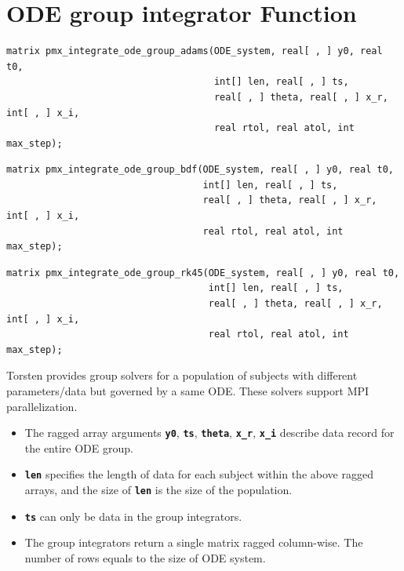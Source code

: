 \documentclass[11pt, reqno, oneside]{amsbook}
\numberwithin{equation}{chapter}
\numberwithin{figure}{chapter}
\numberwithin{table}{chapter}
\theoremstyle{remark}
\begin{document}
\section{ODE group  integrator Function}
\label{sec:org5e1b7bb}
\begin{verbatim}
matrix pmx_integrate_ode_group_adams(ODE_system, real[ , ] y0, real t0,
                                     int[] len, real[ , ] ts,
                                     real[ , ] theta, real[ , ] x_r, int[ , ] x_i,
                                     real rtol, real atol, int max_step);
\end{verbatim}
\begin{verbatim}
matrix pmx_integrate_ode_group_bdf(ODE_system, real[ , ] y0, real t0,
                                   int[] len, real[ , ] ts,
                                   real[ , ] theta, real[ , ] x_r, int[ , ] x_i,
                                   real rtol, real atol, int max_step);
\end{verbatim}
\begin{verbatim}
matrix pmx_integrate_ode_group_rk45(ODE_system, real[ , ] y0, real t0,
                                    int[] len, real[ , ] ts,
                                    real[ , ] theta, real[ , ] x_r, int[ , ] x_i,
                                    real rtol, real atol, int max_step);
\end{verbatim}
Torsten provides group solvers for a population of subjects with different parameters/data but
governed by a same ODE. These solvers support MPI parallelization.
\begin{itemize}
\item The ragged array arguments {\small \color{MRGGreen} \texttt{\textbf{y0}}}, {\small \color{MRGGreen} \texttt{\textbf{ts}}}, {\small \color{MRGGreen} \texttt{\textbf{theta}}}, {\small \color{MRGGreen} \texttt{\textbf{x\_r}}}, {\small \color{MRGGreen} \texttt{\textbf{x\_i}}} describe data record for the
entire ODE group.
\item {\small \color{MRGGreen} \texttt{\textbf{len}}} specifies the length of data for each subject within
the above ragged arrays, and the size of {\small \color{MRGGreen} \texttt{\textbf{len}}} is the size
of the population.
\item {\small \color{MRGGreen} \texttt{\textbf{ts}}} can only be data in the group integrators.
\item The group integrators return a single matrix ragged
column-wise. The number of rows equals to the size of ODE system.
\end{itemize}
\end{document}
